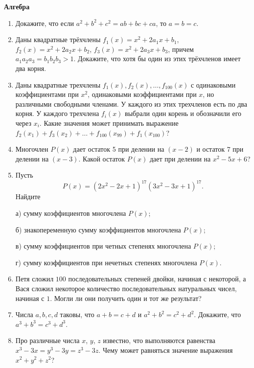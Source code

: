 \documentclass{article}
\begin{document}
\large
	
	
	\begin{center}
		\textbf{Алгебра}
	\end{center}

\begin{enumerate}[label*=\protect\fbox{\arabic{enumi}}]
	
\item Докажите, что если $a^2 + b^2 + c^2 = ab + bc + ca$, то $a = b = c$.

\item  Даны квадратные трёхчлены $f_1(x) = x^2 + 2a_1x + b_1$, $f_2(x) = x^2 + 2a_2x + b_2$, $f_3(x) = x^2 + 2a_3x + b_3$, причем $a_1a_2a_3 = b_1b_2b_3 > 1$. Докажите, что хотя бы один из этих трёхчленов имеет два корня.

\item Даны квадратные трехчлены $f_1(x), f_2(x), \ldots, f_{100}(x)$ с одинаковыми коэффициентами при $x^2$, одинаковыми коэффициентами при $x$, но различными свободными членами. У каждого из этих трехчленов есть по два корня. У каждого трехчлена $f_i(x)$ выбрали один корень и обозначили его через $x_i$. Какие значения может принимать выражение $f_2(x_1) + f_3(x_2) + \ldots + f_{100}(x_{99}) + f_1(x_{100})$?

\item Многочлен $P(x)$ дает остаток 5 при делении на $(x-2)$ и остаток 7 при делении на $(x-3)$. Какой остаток $P(x)$ дает при делении на $x^2 - 5x + 6$?

\item Пусть $$P(x) = (2x^2 - 2x + 1)^{17} (3x^2 - 3x + 1)^{17}.$$ Найдите 

а) сумму коэффициентов многочлена $P(x)$;

б) знакопеременную сумму коэффициентов многочлена $P(x)$;

в) сумму коэффициентов при четных степенях многочлена $P(x)$;

г) сумму коэффициентов при нечетных степенях многочлена $P(x)$.

\item Петя сложил $100$ последовательных степеней двойки, начиная с некоторой, а Вася сложил некоторое количество последовательных натуральных чисел, начиная с $1$. Могли ли они получить один и тот же результат?

\item Числа $a, b, c, d$ таковы, что $a + b = c + d$ и $a^2 + b^2 = c^2 + d^2$. Докажите, что $a^3 + b^3 = c^3 + d^3$.

\item Про различные числа $x$, $y$, $z$ известно, что выполняются равенства $x^3 - 3x = y^3 - 3y = z^3 - 3z$. Чему может равняться значение выражения $x^2 + y^2 + z^2$?


\end{enumerate}
\end{document}
